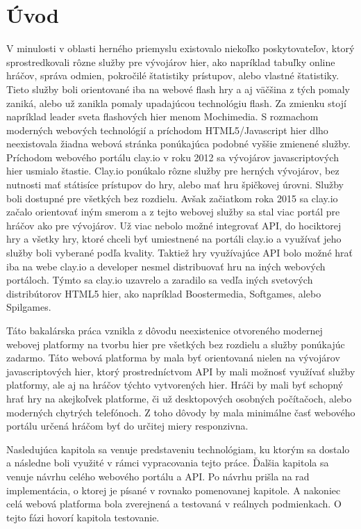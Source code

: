 
\chapter{Úvod}
V minulosti v oblasti herného priemyslu existovalo niekoľko poskytovateľov, ktorý sprostredkovali rôzne služby pre vývojárov hier, ako napríklad tabuľky online hráčov, správa odmien, pokročilé štatistiky prístupov, alebo vlastné štatistiky. Tieto služby boli orientované iba na webové flash hry a aj väčšina z tých pomaly zaniká, alebo už zanikla pomaly upadajúcou technológiu flash. Za zmienku stojí napríklad leader sveta flashových hier menom Mochimedia. S rozmachom moderných webových technológií a príchodom HTML5/Javascript hier dlho neexistovala žiadna webová stránka ponúkajúca podobné vyššie zmienené služby. Príchodom webového portálu clay.io v roku 2012 sa vývojárov javascriptových hier usmialo štastie. Clay.io ponúkalo rôzne služby pre herných vývojárov, bez nutnosti mať státisíce prístupov do hry, alebo mať hru špičkovej úrovni. Služby boli dostupné pre všetkých bez rozdielu. Avšak začiatkom roka 2015 sa clay.io začalo orientovať iným smerom a z tejto webovej služby sa stal viac portál pre hráčov ako pre vývojárov. Už viac nebolo možné integrovať API, do hociktorej hry a všetky hry, ktoré chceli byť umiestnené na portáli clay.io a využívať jeho služby boli vyberané podľa kvality. Taktiež hry využívajúce API bolo možné hrať iba na webe clay.io a developer nesmel distribuovať hru na iných webových portáloch. Týmto sa clay.io uzavrelo a zaradilo sa vedľa iných svetových distribútorov HTML5 hier, ako napríklad Boostermedia, Softgames, alebo Spilgames.

Táto bakalárska práca vznikla z dôvodu neexistenice otvoreného modernej webovej platformy na tvorbu hier pre všetkých bez rozdielu a služby ponúkajúc zadarmo. Táto webová platforma by mala byť orientovaná nielen na vývojárov javascriptových hier, ktorý prostredníctvom API by mali možnosť využívať služby platformy, ale aj na hráčov týchto vytvorených hier. Hráči by mali byť schopný hrať hry na akejkoľvek platforme, či už desktopových osobných počítačoch, alebo moderných chytrých telefónoch. Z toho dôvody by mala minimálne časť webového portálu určená hráčom byť do určitej miery responzivna.

Nasledujúca kapitola sa venuje predstaveniu technológiam, ku ktorým sa dostalo a následne boli využité v rámci vypracovania tejto práce. Ďalšia kapitola sa venuje návrhu celého webového portálu a API. Po návrhu prišla na rad implementácia, o ktorej je písané v rovnako pomenovanej kapitole. A nakoniec celá webová platforma bola zverejnená a testovaná v reálnych podmienkach. O tejto fázi hovorí kapitola testovanie.

